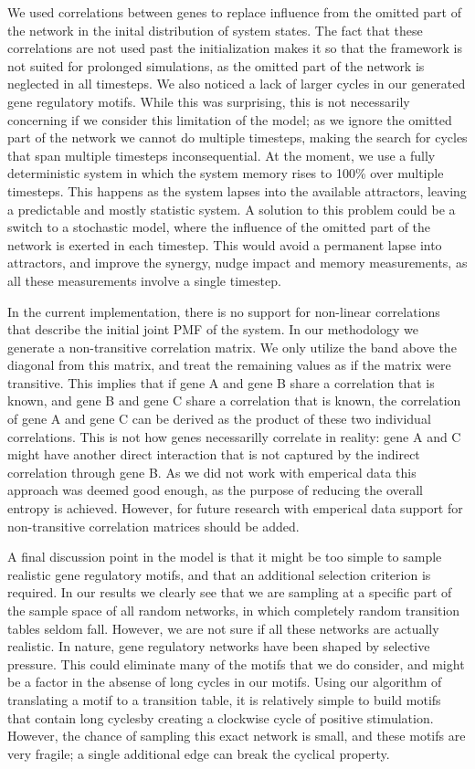 \documentclass[../main.tex]{subfiles}
\begin{document}
We used correlations between genes to replace influence from the omitted part of the network in the inital distribution of system states.
The fact that these correlations are not used past the initialization makes it so that the framework is not suited for prolonged simulations, as the omitted part of the network is neglected in all timesteps.
We also noticed a lack of larger cycles in our generated gene regulatory motifs. %
While this was surprising, this is not necessarily concerning if we consider this limitation of the model; as we ignore the omitted part of the network we cannot do multiple timesteps, making the search for cycles that span multiple timesteps inconsequential. 
At the moment, we use a fully deterministic system in which the system memory rises to 100\% over multiple timesteps.
This happens as the system lapses into the available attractors, leaving a predictable and mostly statistic system.
A solution to this problem could be a switch to a stochastic model, where the influence of the omitted part of the network is exerted in each timestep.
This would avoid a permanent lapse into attractors, and improve the synergy, nudge impact and memory measurements, as all these measurements involve a single timestep.

In the current implementation, there is no support for non-linear correlations that describe the initial joint PMF of the system.
In our methodology we generate a non-transitive correlation matrix.
We only utilize the band above the diagonal from this matrix, and treat the remaining values as if the matrix were transitive.
This implies that if gene A and gene B share a correlation that is known, and gene B and gene C share a correlation that is known, the correlation of gene A and gene C can be derived as the product of these two individual correlations.
This is not how genes necessarilly correlate in reality: gene A and C might have another direct interaction that is not captured by the indirect correlation through gene B.
As we did not work with emperical data this approach was deemed good enough, as the purpose of reducing the overall entropy is achieved.
However, for future research with emperical data support for non-transitive correlation matrices should be added.

A final discussion point in the model is that it might be too simple to sample realistic gene regulatory motifs, and that an additional selection criterion is required.
In our results we clearly see that we are sampling at a specific part of the sample space of all random networks, in which completely random transition tables seldom fall.
However, we are not sure if all these networks are actually realistic.
In nature, gene regulatory networks have been shaped by selective pressure.
This could eliminate many of the motifs that we do consider, and might be a factor in the absense of long cycles in our motifs.
Using our algorithm of translating a motif to a transition table, it is relatively simple to build motifs that  contain long cyclesby creating a clockwise cycle of positive stimulation.
However, the chance of sampling this exact network is small, and these motifs are very fragile; a single additional edge can break the cyclical property.
\end{document}
